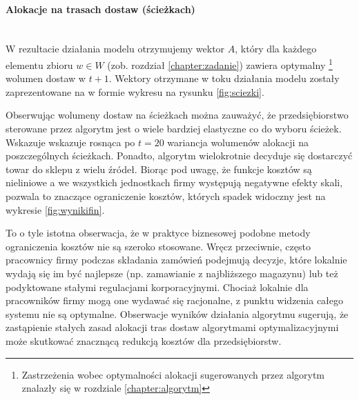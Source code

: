 \documentclass[polish, twoside, 12pt, a4paper]{article}
\theoremstyle{definition}
\theoremstyle{plain}
\theoremstyle{remark}
\begin{document}
\paragraph{Alokacje na trasach dostaw (ścieżkach)}\mbox{}\\

W rezultacie działania modelu otrzymujemy wektor $A$, który dla każdego elementu zbioru $w \in W$ (zob. rozdział \ref{chapter:zadanie}) zawiera optymalny \footnote{Zastrzeżenia wobec optymalności alokacji sugerowanych przez algorytm znalazły się w rozdziale \ref{chapter:algorytm}} wolumen dostaw w $t+1$. Wektory otrzymane w toku działania modelu zostały zaprezentowane na w formie wykresu na rysunku \ref{fig:sciezki}.

Obserwując wolumeny dostaw na ścieżkach można zauważyć, że przedsiębiorstwo sterowane przez algorytm jest o wiele bardziej elastyczne co do wyboru ścieżek. Wskazuje wskazuje rosnąca po $t=20$ wariancja wolumenów alokacji na poszczególnych ścieżkach. Ponadto, algorytm wielokrotnie decyduje się dostarczyć towar do sklepu z wielu źródeł. Biorąc pod uwagę, że funkcje kosztów są nieliniowe a we wszystkich jednostkach firmy występują negatywne efekty skali, pozwala to znaczące ograniczenie kosztów, których spadek widoczny jest na wykresie \ref{fig:wynikifin}.

To o tyle istotna obserwacja, że w praktyce biznesowej podobne metody ograniczenia kosztów nie są szeroko stosowane. Wręcz przeciwnie, często pracownicy firmy podczas składania zamówień podejmują decyzje, które lokalnie wydają się im być najlepsze (np. zamawianie z najbliższego magazynu) lub też podyktowane stałymi regulacjami korporacyjnymi. Chociaż lokalnie dla pracowników firmy mogą one wydawać się racjonalne, z punktu widzenia całego systemu nie są optymalne. Obserwacje wyników działania algorytmu sugerują, że zastąpienie stałych zasad alokacji tras dostaw algorytmami optymalizacyjnymi może skutkować znacznącą redukcją kosztów dla przedsiębiorstw.
\end{document}
